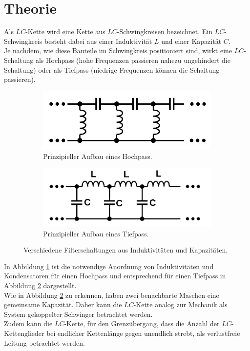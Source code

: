 \section{Theorie}
\label{sec:Theorie}
Als $LC$-Kette wird eine Kette aus $LC$-Schwingkreisen bezeichnet.
Ein $LC$-Schwingkreis besteht dabei aus einer Induktivität $L$ und einer Kapazität $C$.\\
Je nachdem, wie diese Bauteile im Schwingkreis positioniert sind, wirkt eine $LC$-Schaltung als Hochpass (hohe Frequenzen passieren nahezu ungehindert die Schaltung)
oder als Tiefpass (niedrige Frequenzen können die Schaltung passieren).\\
\begin{figure}
	\centering
	\begin{subfigure}{0.48\textwidth}
		\includegraphics[width=\textwidth]{Bilder/hochpass_schema.png}
		\caption{Prinzipieller Aufbau eines Hochpass.}
		\label{fig:hoch}
	\end{subfigure}
	\begin{subfigure}{0.48\textwidth}
		\includegraphics[width=\textwidth]{Bilder/tiefpass_schema.png}
		\caption{Prinzipieller Aufbau eines Tiefpass.}
		\label{fig:tief}
	\end{subfigure}
	\caption{Verschiedene Filterschaltungen aus Induktivitäten und Kapazitäten. \cite{Anleitung}}\label{fig:filter}
\end{figure}
In Abbildung \ref{fig:hoch} ist die notwendige Anordnung von Induktivitäten
und Kondensatoren für einen Hochpass und entsprechend für einen Tiefpass in Abbildung \ref{fig:tief} dargestellt.\\
Wie in Abbildung \ref{fig:tief} zu erkennen, haben zwei benachbarte Maschen eine gemeinsame Kapazität. Daher kann die $LC$-Kette analog zur
Mechanik als System gekoppelter Schwinger betrachtet werden.\\
Zudem kann die $LC$-Kette, für den Grenzübergang, dass die Anzahl der $LC$-Kettenglieder bei endlicher Kettenlänge gegen unendlich strebt, als verlustfreie Leitung betrachtet werden.
\FloatBarrier

